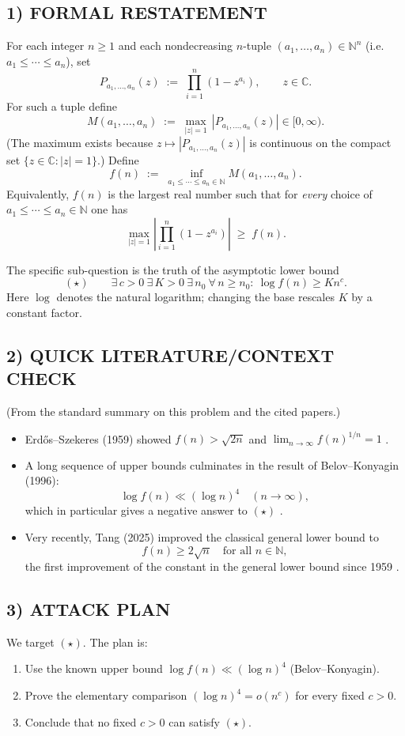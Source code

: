 \subsection*{1) FORMAL RESTATEMENT}
For each integer $n\ge 1$ and each nondecreasing $n$-tuple $(a_1,\dots,a_n)\in\mathbb{N}^n$ (i.e. $a_1\le\cdots\le a_n$), set
\[
P_{a_1,\dots,a_n}(z) \;:=\; \prod_{i=1}^n (1-z^{a_i}),\qquad z\in\mathbb{C}.
\]
For such a tuple define
\[
M(a_1,\dots,a_n)\;:=\;\max_{\left\lvert z\right\rvert=1}\,\left\lvert P_{a_1,\dots,a_n}(z)\right\rvert\in[0,\infty).
\]
(The maximum exists because $z\mapsto\left\lvert P_{a_1,\dots,a_n}(z)\right\rvert$ is continuous on the compact set $\{z\in\mathbb{C}:\left\lvert z\right\rvert=1\}$.)
Define
\[
f(n)\;:=\;\inf_{a_1\le\cdots\le a_n\in\mathbb{N}} M(a_1,\dots,a_n).
\]
Equivalently, $f(n)$ is the largest real number such that for \emph{every} choice of $a_1\le\cdots\le a_n\in\mathbb{N}$ one has
\[
\max_{\left\lvert z\right\rvert=1}\left\lvert \prod_{i=1}^n (1-z^{a_i})\right\rvert\;\ge\; f(n).
\]

The specific sub-question is the truth of the asymptotic lower bound
\[
(\star)\qquad \exists\,c>0\ \exists\,K>0\ \exists\,n_0\ \forall\,n\ge n_0:\ \log f(n)\ge K n^c.
\]
Here $\log$ denotes the natural logarithm; changing the base rescales $K$ by a constant factor.

\subsection*{2) QUICK LITERATURE/CONTEXT CHECK}
(From the standard summary on this problem and the cited papers.)
\begin{itemize}[leftmargin=2.2em]
\item Erd\H{o}s--Szekeres (1959) showed $f(n)>\sqrt{2n}$ and $\lim_{n\to\infty} f(n)^{1/n}=1$ \cite{ErSz59}.
\item A long sequence of upper bounds culminates in the result of Belov--Konyagin (1996):
\[\log f(n)\ll (\log n)^4\quad(n\to\infty),\]
which in particular gives a negative answer to $(\star)$ \cite{BeKo96}.
\item Very recently, Tang (2025) improved the classical general lower bound to
\[ f(n)\ge 2\sqrt{n}\quad\text{for all }n\in\mathbb{N},\]
the first improvement of the constant in the general lower bound since 1959 \cite{Tang25}.
\end{itemize}

\subsection*{3) ATTACK PLAN}
We target $(\star)$.  The plan is:
\begin{enumerate}[leftmargin=2.2em]
\item Use the known upper bound $\log f(n)\ll(\log n)^4$ (Belov--Konyagin).
\item Prove the elementary comparison $(\log n)^4 = o(n^c)$ for every fixed $c>0$.
\item Conclude that no fixed $c>0$ can satisfy $(\star)$.
\end{enumerate}

